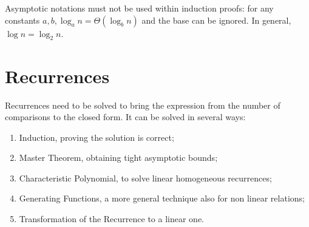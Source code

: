 Asymptotic notations must not be used within induction proofs: for any constants $a, b, \log_a n = \Theta(\log_b n)$ and the base can be ignored. In general, $\log n = \log_2 n$.

\section{Recurrences}
Recurrences need to be solved to bring the expression from the number of comparisons to the closed form. It can be solved in several ways:
\begin{enumerate}
	\item Induction, proving the solution is correct;
	\item Master Theorem, obtaining tight asymptotic bounds;
	\item Characteristic Polynomial, to solve linear homogeneous recurrences;
	\item Generating Functions, a more general technique also for non linear relations;
	\item Transformation of the Recurrence to a linear one.
\end{enumerate}





